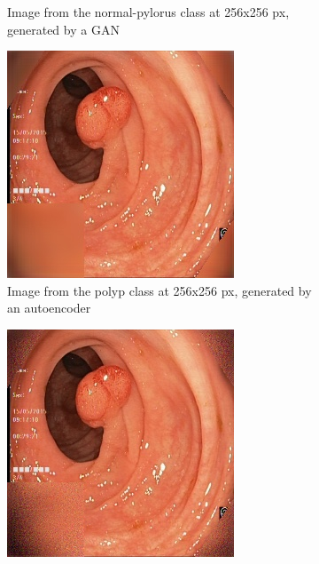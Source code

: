 \begin{figure}
\begin{subfigure}[t]{0.4\textwidth}
            \caption{Image from the normal-pylorus class at 256x256 px, generated by a GAN }    
            \label{fig:np_GAN_both1}
        \end{subfigure}
        \qquad\vfill%
        \begin{subfigure}[t]{0.4\textwidth}   
            \centering 
            \includegraphics[width=\textwidth]{experiments/figures/both/PAE.jpg}
            \caption{Image from the polyp class at 256x256 px, generated by an autoencoder }    
            \label{fig:p_AE_both1}
        \end{subfigure}
        \qquad%
        \begin{subfigure}[t]{0.4\textwidth}   
            \centering 
            \includegraphics[width=\textwidth]{experiments/figures/both/PGAN.jpg}

\end{subfigure}
\end{figure}
